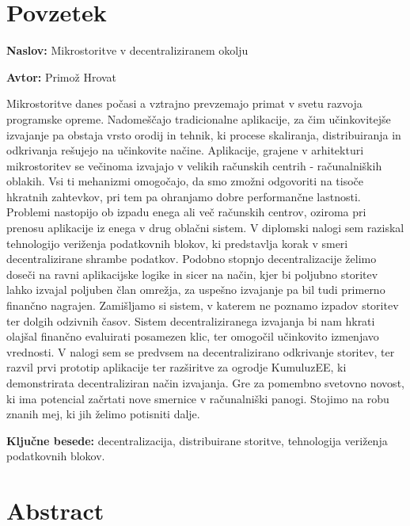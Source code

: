 \documentclass[a4paper, 12pt]{book}
\newcommand{\ttitle}{Mikrostoritve v decentraliziranem okolju}
\newcommand{\tauthor}{Primož Hrovat}
\newcommand{\tkeywords}{decentralizacija, distribuirane storitve, tehnologija veriženja podatkovnih blokov}
\newcommand{\clearemptydoublepage}{\newpage{\pagestyle{empty}\cleardoublepage}}
\begin{document}
\clearemptydoublepage

\chapter*{Povzetek}

\noindent\textbf{Naslov:} \ttitle
\bigskip

\noindent\textbf{Avtor:} \tauthor
\bigskip

\noindent

Mikrostoritve danes počasi a vztrajno prevzemajo primat v svetu razvoja programske opreme.
Nadomeščajo tradicionalne aplikacije, za čim učinkovitejše izvajanje pa obstaja vrsto orodij in tehnik, ki procese skaliranja, distribuiranja in odkrivanja rešujejo na učinkovite načine.
Aplikacije, grajene v arhitekturi mikrostoritev se večinoma izvajajo v velikih računskih centrih - računalniških oblakih.
Vsi ti mehanizmi omogočajo, da smo zmožni odgovoriti na tisoče hkratnih zahtevkov, pri tem pa ohranjamo dobre performančne lastnosti.
Problemi nastopijo ob izpadu enega ali več računskih centrov, oziroma pri prenosu aplikacije iz enega v drug oblačni sistem.
V diplomski nalogi sem raziskal tehnologijo veriženja podatkovnih blokov, ki predstavlja korak v smeri decentralizirane shrambe podatkov.
Podobno stopnjo decentralizacije želimo doseči na ravni aplikacijske logike in sicer na način, kjer bi poljubno storitev lahko izvajal poljuben član omrežja, za uspešno izvajanje pa bil tudi primerno finančno nagrajen.
Zamišljamo si sistem, v katerem ne poznamo izpadov storitev ter dolgih odzivnih časov.
Sistem decentraliziranega izvajanja bi nam hkrati olajšal finančno evaluirati posamezen klic, ter omogočil učinkovito izmenjavo vrednosti.
V nalogi sem se predvsem na decentralizirano odkrivanje storitev, ter razvil prvi prototip aplikacije ter razširitve za ogrodje KumuluzEE, ki demonstrirata decentraliziran način izvajanja.
Gre za pomembno svetovno novost, ki ima potencial začrtati nove smernice v računalniški panogi.
Stojimo na robu znanih mej, ki jih želimo potisniti dalje.

\bigskip

\noindent\textbf{Ključne besede:} \tkeywords.
\clearemptydoublepage

\chapter*{Abstract}
\end{document}
